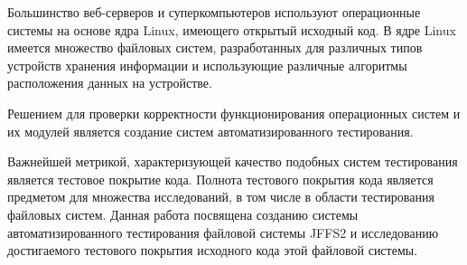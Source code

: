 Большинство веб-серверов и суперкомпьютеров используют операционные системы на основе ядра Linux, имеющего открытый исходный код. В ядре Linux имеется множество файловых систем, разработанных для различных типов устройств хранения информации и использующие различные алгоритмы расположения данных на устройстве. 

Решением для проверки корректности функционирования операционных систем и их модулей является создание систем автоматизированного тестирования.  

Важнейшей метрикой, характеризующей качество подобных систем тестирования является тестовое покрытие кода. Полнота тестового покрытия кода является предметом для множества исследований, в том числе в области тестирования файловых систем. Данная работа посвящена созданию системы автоматизированного тестирования файловой системы JFFS2 и исследованию достигаемого тестового покрытия исходного кода этой файловой системы.

\newpage
